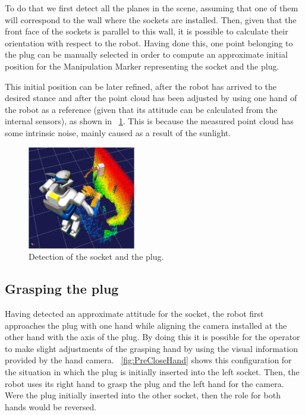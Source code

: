 		To do that we first detect all the planes in the scene, assuming that one of them will correspond
		to the wall where the sockets are installed.
		Then, given that the front face of the sockets is parallel to this wall, it is possible
		to calculate their orientation with respect to the robot.
		Having done this, one point belonging to the plug can be manually selected in order to compute
		an approximate initial position for the Manipulation Marker representing the socket and the plug.
		
		This initial position can be later refined, after the robot has arrived to the desired stance and
		after the point cloud has been adjusted by using one hand of the robot as a reference
		(given that its attitude can be calculated from the internal sensors), as shown in
		\figurename~\ref{fig:SocketPlugMarker}.
		This is because the measured point cloud has some intrinsic noise, mainly caused as a result of
		the sunlight.
		
		\begin{figure}[b]
			\centering
			\includegraphics[height = 4.5cm]{img/SocketPlugMarker}
			\caption{Detection of the socket and the plug.}
			\label{fig:SocketPlugMarker}
		\end{figure}
		
	\subsection{Grasping the plug}
		
		Having detected an approximate attitude for the socket, the robot first approaches the plug
		with one hand while aligning the camera installed at the other hand with the axis of the plug.
		By doing this it is possible for the operator to make slight adjustments of the grasping hand
		by using the visual information provided by the hand camera.
		\figurename~\ref{fig:PreCloseHand} shows this configuration for the situation in which the plug
		is initially inserted into the left socket.
		Then, the robot uses its right hand to grasp the plug and the left hand for the camera.
		Were the plug initially inserted into the other socket, then the role for both hands would be
		reversed.
		
